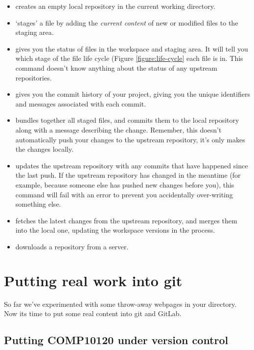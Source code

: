 \begin{itemize}
\item {} creates an empty local repository in the current working directory. 
\item {} `stages' a file by adding the \emph{current content} of new or modified files to the staging area. 
\item {} gives you the status of files in the workspace and staging area. It will tell you which stage of the file life cycle (Figure \ref{figure:life-cycle} each file is in. This command doesn't know anything about the status of any upstream repositories.
\item {} gives you the commit history of your project, giving you the unique identifiers and messages associated with each commit.
\item {} bundles together all staged files, and commits them to the local repository along with a message describing the change. Remember, this doesn't automatically push your changes to the upstream repository, it's only makes the changes locally. 
\item {} updates the upstream repository with any commits that have happened since the last push. If the upstream repository has changed in the meantime (for example, because someone else has pushed new changes before you), this command will fail with an error to prevent you accidentally over-writing something else.
\item {} fetches the latest changes from the upstream repository, and merges them into the local one, updating the workspace versions in the process.
\item {} downloads a repository from a server.  
\end{itemize}

\section{Putting real work into git}

So far we've experimented with some throw-away webpages in your  directory. Now its time to put some real content into git and GitLab.

\subsection{Putting COMP10120 under version control}

